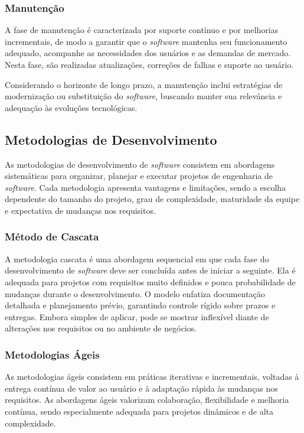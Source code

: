 \subsubsection{Manutenção}

A fase de manutenção é caracterizada por suporte contínuo e por melhorias incrementais, de modo a garantir que o \emph{software} mantenha seu funcionamento adequado, acompanhe as necessidades dos usuários e as demandas de mercado. Nesta fase, são realizadas atualizações, correções de falhas e suporte ao usuário.

Considerando o horizonte de longo prazo, a manutenção inclui estratégias de modernização ou substituição do \emph{software}, buscando manter sua relevância e adequação às evoluções tecnológicas.

\subsection{Metodologias de Desenvolvimento}

As metodologias de desenvolvimento de \emph{software} consistem em abordagens sistemáticas para organizar, planejar e executar projetos de engenharia de \emph{software}. Cada metodologia apresenta vantagens e limitações, sendo a escolha dependente do tamanho do projeto, grau de complexidade, maturidade da equipe e expectativa de mudanças nos requisitos.

\subsubsection{Método de Cascata}

A metodologia cascata é uma abordagem sequencial em que cada fase do desenvolvimento de \emph{software} deve ser concluída antes de iniciar a seguinte. Ela é adequada para projetos com requisitos muito definidos e pouca probabilidade de mudanças durante o desenvolvimento. O modelo enfatiza documentação detalhada e planejamento prévio, garantindo controle rígido sobre prazos e entregas. Embora simples de aplicar, pode se mostrar inflexível diante de alterações nos requisitos ou no ambiente de negócios.

\subsubsection{Metodologias Ágeis}

As metodologias ágeis consistem em práticas iterativas e incrementais, voltadas à entrega contínua de valor ao usuário e à adaptação rápida às mudanças nos requisitos. As abordagens ágeis valorizam colaboração, flexibilidade e melhoria contínua, sendo especialmente adequada para projetos dinâmicos e de alta complexidade.

